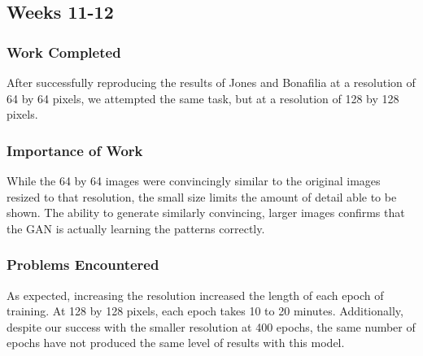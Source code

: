 \documentclass[12pt,letterpaper]{article}
\begin{document}
		\subsection{Weeks 11-12}
			\subsubsection{Work Completed}
				After successfully reproducing the results of Jones and Bonafilia at a resolution of 64 by 64 pixels, we attempted the same task, but at a resolution of 128 by 128 pixels.

			\subsubsection{Importance of Work}
				While the 64 by 64 images were convincingly similar to the original images resized to that resolution, the small size limits the amount of detail able to be shown.
				The ability to generate similarly convincing, larger images confirms that the GAN is actually learning the patterns correctly.

			\subsubsection{Problems Encountered}
				As expected, increasing the resolution increased the length of each epoch of training.
				At 128 by 128 pixels, each epoch takes 10 to 20 minutes.
				Additionally, despite our success with the smaller resolution at 400 epochs, the same number of epochs have not produced the same level of results with this model.




\nocite{*}
\end{document}
